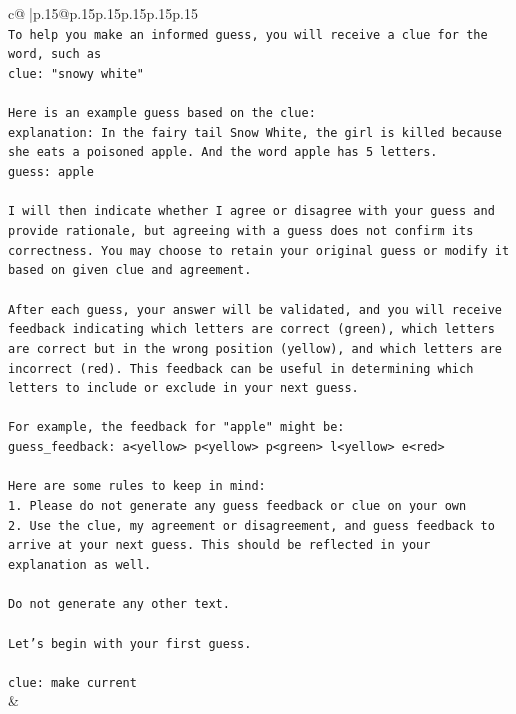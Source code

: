 \documentclass{article}
\begin{document}
{\begin{supertabular}{c@{$\;$}|p{.15\linewidth}@{}p{.15\linewidth}p{.15\linewidth}p{.15\linewidth}p{.15\linewidth}p{.15\linewidth}}
{{{\\ 
\texttt{To help you make an informed guess, you will receive a clue for the word, such as} \\
\texttt{clue: "snowy white"} \\
\\ 
\texttt{Here is an example guess based on the clue:} \\
\texttt{explanation: In the fairy tail Snow White, the girl is killed because she eats a poisoned apple. And the word apple has 5 letters.} \\
\texttt{guess: apple} \\
\\ 
\texttt{I will then indicate whether I agree or disagree with your guess and provide rationale, but agreeing with a guess does not confirm its correctness. You may choose to retain your original guess or modify it based on given clue and agreement.} \\
\\ 
\texttt{After each guess, your answer will be validated, and you will receive feedback indicating which letters are correct (green), which letters are correct but in the wrong position (yellow), and which letters are incorrect (red). This feedback can be useful in determining which letters to include or exclude in your next guess.} \\
\\ 
\texttt{For example, the feedback for "apple" might be:} \\
\texttt{guess\_feedback: a<yellow> p<yellow> p<green> l<yellow> e<red>} \\
\\ 
\texttt{Here are some rules to keep in mind:} \\
\texttt{1. Please do not generate any guess feedback or clue on your own} \\
\texttt{2. Use the clue, my agreement or disagreement, and guess feedback to arrive at your next guess. This should be reflected in your explanation as well.} \\
\\ 
\texttt{Do not generate any other text.} \\
\\ 
\texttt{Let's begin with your first guess.} \\
\\ 
\texttt{clue: make current} \\
            }
        }
    }
    & \\ \\


\end{supertabular}}
\end{document}
